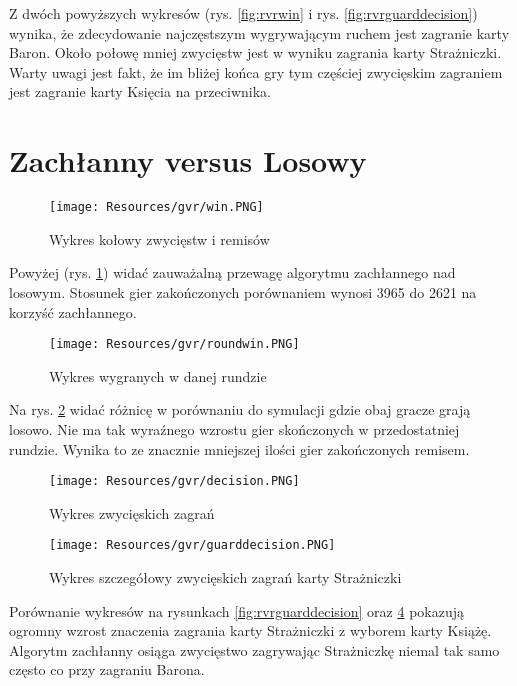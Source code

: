 Z dwóch powyższych wykresów (rys. \ref{fig:rvrwin} i rys. \ref{fig:rvrguarddecision}) wynika, że zdecydowanie najczęstszym wygrywającym ruchem jest zagranie karty Baron. Około połowę mniej zwycięstw jest w wyniku zagrania karty Strażniczki. Warty uwagi jest fakt, że im bliżej końca gry tym częściej zwycięskim zagraniem jest zagranie karty Księcia na przeciwnika.

\section{Zachłanny versus Losowy}

\begin{figure}[H]
	\centering
	\texttt{[image: Resources/gvr/win.PNG]}
	\caption{Wykres kołowy zwycięstw i remisów} 
	\label{fig:gvrwin}
\end{figure}

Powyżej (rys. \ref{fig:gvrwin}) widać zauważalną przewagę algorytmu zachłannego nad losowym. Stosunek gier zakończonych porównaniem wynosi 3965 do 2621 na korzyść zachłannego.

\begin{figure}[H]
	\centering
	\texttt{[image: Resources/gvr/roundwin.PNG]}
	\caption{Wykres wygranych w danej rundzie} 
	\label{fig:gvrroundwin}
\end{figure}

Na rys. \ref{fig:gvrroundwin} widać różnicę w porównaniu do symulacji gdzie obaj gracze grają losowo. Nie ma tak wyraźnego wzrostu gier skończonych w przedostatniej rundzie. Wynika to ze znacznie mniejszej ilości gier zakończonych remisem.

\clearpage
\begin{figure}[H]
	\centering
	\texttt{[image: Resources/gvr/decision.PNG]}
	\caption{Wykres zwycięskich zagrań} 
	\label{fig:gvrdecision}
\end{figure} 

\begin{figure}[H]
	\centering
	\texttt{[image: Resources/gvr/guarddecision.PNG]}
	\caption{Wykres szczegółowy zwycięskich zagrań karty Strażniczki} 
	\label{fig:gvrguarddecision}
\end{figure}

Porównanie wykresów na rysunkach \ref{fig:rvrguarddecision} oraz \ref{fig:gvrguarddecision} pokazują ogromny wzrost znaczenia zagrania karty Strażniczki z wyborem karty Książę. Algorytm zachłanny osiąga zwycięstwo zagrywając Strażniczkę niemal tak samo często co przy zagraniu Barona.

